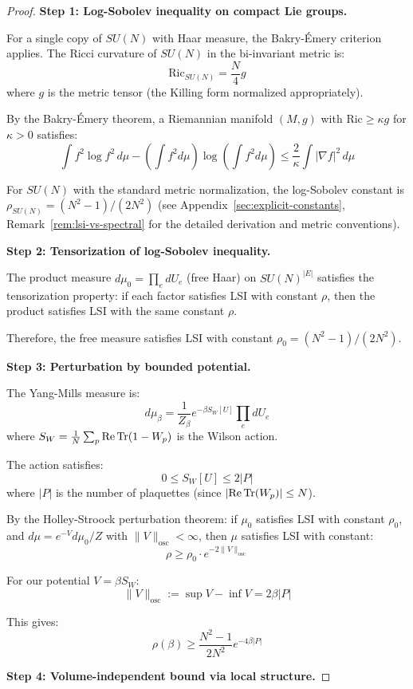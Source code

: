 \begin{proof}
\textbf{Step 1: Log-Sobolev inequality on compact Lie groups.}

For a single copy of $SU(N)$ with Haar measure, the Bakry-Émery criterion 
applies. The Ricci curvature of $SU(N)$ in the bi-invariant metric is:
\[
\mathrm{Ric}_{SU(N)} = \frac{N}{4} g
\]
where $g$ is the metric tensor (the Killing form normalized appropriately).

By the Bakry-Émery theorem, a Riemannian manifold $(M, g)$ with 
$\mathrm{Ric} \geq \kappa g$ for $\kappa > 0$ satisfies:
\[
\int f^2 \log f^2 \, d\mu - \left(\int f^2 d\mu\right)\log\left(\int f^2 d\mu\right) 
\leq \frac{2}{\kappa} \int |\nabla f|^2 \, d\mu
\]

For $SU(N)$ with the standard metric normalization, the log-Sobolev constant is 
$\rho_{SU(N)} = (N^2-1)/(2N^2)$ (see Appendix~\ref{sec:explicit-constants}, 
Remark~\ref{rem:lsi-vs-spectral} for the detailed derivation and metric conventions).

\textbf{Step 2: Tensorization of log-Sobolev inequality.}

The product measure $d\mu_0 = \prod_e dU_e$ (free Haar) on $SU(N)^{|E|}$ 
satisfies the tensorization property: if each factor satisfies LSI with 
constant $\rho$, then the product satisfies LSI with the same constant $\rho$.

Therefore, the free measure satisfies LSI with constant $\rho_0 = (N^2-1)/(2N^2)$.

\textbf{Step 3: Perturbation by bounded potential.}

The Yang-Mills measure is:
\[
d\mu_\beta = \frac{1}{Z_\beta} e^{-\beta S_W[U]} \prod_e dU_e
\]
where $S_W = \frac{1}{N}\sum_p \mathrm{Re}\operatorname{Tr}(1 - W_p)$ is the Wilson action.

The action satisfies:
\[
0 \leq S_W[U] \leq 2|P|
\]
where $|P|$ is the number of plaquettes (since $|\mathrm{Re}\operatorname{Tr}(W_p)| \leq N$).

By the Holley-Stroock perturbation theorem: if $\mu_0$ satisfies LSI with 
constant $\rho_0$, and $d\mu = e^{-V} d\mu_0 / Z$ with $\|V\|_{\mathrm{osc}} < \infty$, 
then $\mu$ satisfies LSI with constant:
\[
\rho \geq \rho_0 \cdot e^{-2\|V\|_{\mathrm{osc}}}
\]

For our potential $V = \beta S_W$:
\[
\|V\|_{\mathrm{osc}} := \sup V - \inf V = 2\beta |P|
\]

This gives:
\[
\rho(\beta) \geq \frac{N^2-1}{2N^2} e^{-4\beta |P|}
\]

\textbf{Step 4: Volume-independent bound via local structure.}


\end{proof}
